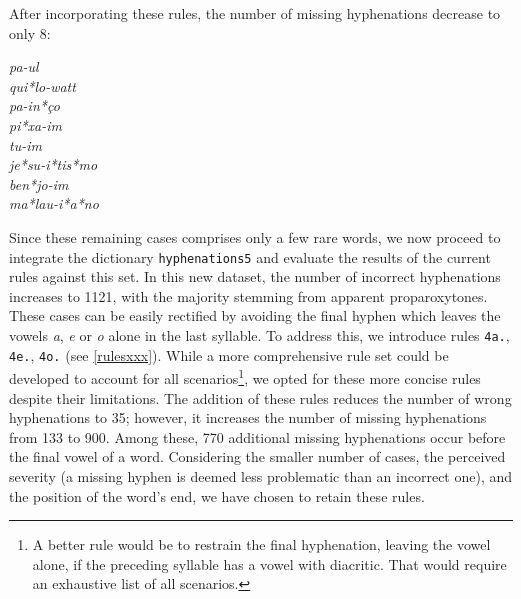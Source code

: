 After incorporating these rules, the number of missing hyphenations decrease to only 8:
\begin{multicols}{5}
\setlength{\columnsep}{0pt}
\setlength{\parindent}{0pt}
\emph{pa-ul \\ qui*lo-watt \\ pa-in*ço \\ pi*xa-im \\ tu-im \\ je*su-i*tis*mo \\  ben*jo-im  \\  ma*lau-i*a*no}
\end{multicols}
\noindent{}Since these remaining cases comprises only a few rare words, we now proceed to integrate the dictionary \texttt{hyphenations5} and 
evaluate the results of the current rules against this set. 
In this new dataset, the number of incorrect hyphenations
increases to 1121, with the majority stemming from apparent proparoxytones. These cases can be easily rectified by
avoiding the final hyphen which leaves the vowels \emph{a}, \emph{e} or \emph{o} alone in the last syllable.
To address this, we introduce rules \texttt{4a.}, \texttt{4e.}, \texttt{4o.} (see \cref{rulesxxx}).
While a more comprehensive rule set could be developed to account for all scenarios\footnote{A better rule would be to restrain the final hyphenation, leaving the vowel alone, if the preceding syllable has a vowel with diacritic. That would require an exhaustive list of all scenarios.}, we opted for these more concise rules despite their limitations. 
The addition of these rules reduces the number of wrong hyphenations to 35; however, it increases the number of missing hyphenations 
from 133 to 900. Among these, 770 additional missing hyphenations occur
before the final vowel of a word.
Considering the smaller number of cases, the perceived severity (a missing hyphen is deemed less problematic than an incorrect one), 
and the position of the word's end, we have chosen to retain these rules.

